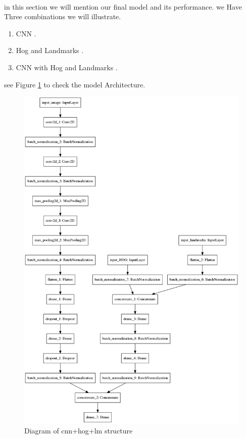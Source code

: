 \paragraph{}
in this section we will mention our final model and its performance.
we Have Three combinations we will illustrate.

\begin{enumerate}
	\item CNN .
	\item Hog and Landmarks .
	\item CNN with Hog and Landmarks .
\end{enumerate}
see Figure \ref{cnn_lm_hog} to check the model Architecture.
\begin{figure}
	\centering
	\includegraphics[width=1\textwidth]{images/cnn_hog_lm.png}
	\caption{Diagram of cnn+hog+lm structure}
	\label{cnn_lm_hog}
\end{figure}
